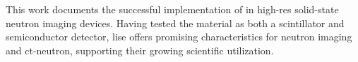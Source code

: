 \documentclass[../../main.tex]{subfiles}%
\begin{document}
%
    \Xsection%
    This work documents the successful implementation of  in \gls{high-res} \gls{solid-state} neutron imaging devices.
    Having tested the material as both a scintillator and semiconductor detector, \gls{lise} offers promising characteristics for neutron imaging and \gls{ct-neutron}, supporting their growing scientific utilization.
\end{document}
